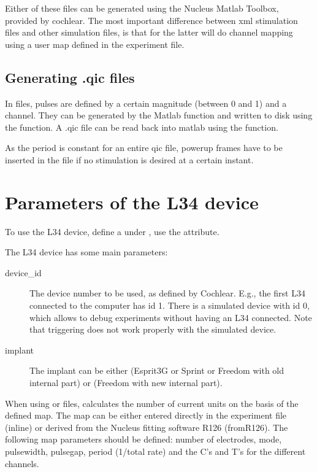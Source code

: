 Either of these files can be generated using the Nucleus Matlab Toolbox, provided by cochlear. The most important difference between xml stimulation files and other simulation files, is that for the latter \apex will do channel mapping using a user map defined in the experiment file.

\subsection{Generating .qic files}
In  files, pulses are defined by a certain magnitude (between 0
and 1) and a channel. They can be generated by the Matlab function
 and written to disk using the  function. A .qic file can be read back into matlab using the  function.

As the period is constant for an entire qic file, powerup frames have to be inserted in the file if no stimulation is desired at a certain instant.



\section{Parameters of the L34 device}

To use the L34 device, define a  under , use the  attribute.

The L34 device has some main parameters:
\begin{description}
\item[device\_id] The device number to be used, as defined by Cochlear. E.g., the first L34 connected to the computer has id 1. There is a simulated device with id 0, which allows to debug experiments without having an L34 connected. Note that triggering does not work properly with the simulated device.
\item[implant] The implant can be either  (Esprit3G or Sprint or
Freedom with old internal part) or  (Freedom with new internal
part).
\end{description}

When using  or  files, \apex calculates the number of current units on the basis of the
defined map. The map can be either entered directly in the experiment file (inline) or
derived from the Nucleus fitting software R126 (fromR126).
The following map parameters should be defined: number of electrodes,
mode, pulsewidth, pulsegap, period (1/total rate) and the C's and
T's for the different channels.

